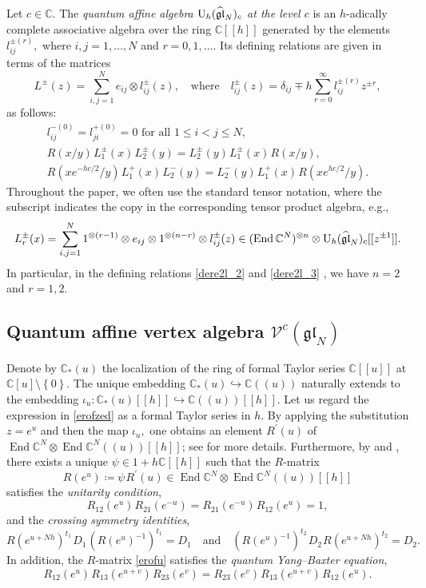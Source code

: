 \documentclass[12pt,a4paper,reqno]{amsart}
\theoremstyle{stil}
\theoremstyle{defi}
\theoremstyle{defi}
\theoremstyle{stil}
\theoremstyle{stil}
\theoremstyle{stil}
\theoremstyle{prim}
\newcommand{\fand}{\quad\text{and}\quad}
\newcommand{\non}{\nonumber}
\newcommand{\beq}{\begin{equation}}
\newcommand{\eeq}{\end{equation}}
\newcommand{\ot}{\otimes}
\newcommand{\ts}{\hspace{1pt}}
\newcommand{\ndo}{\mathop{\mathrm{End}}}
\newcommand{\uh}{{\rm U}_h (\widehat{\mathfrak{gl}}_N)_c}
\newcommand{\CC}{\mathbb{C}}
\newcommand{\Vcdva}{\mathcal{V}^{c}(\mathfrak{gl}_N)}
\begin{document}
 
 

Let $c\in\CC .$ The {\em quantum affine algebra $\uh$ at the level $c$} is an $h$-adically complete associative algebra over the ring $\CC[[h]]$ generated by the elements $l_{ij}^{\pm(r)},$ where $i,j=1,\ldots ,N $ and $r=0,1,\ldots.$ Its defining relations are given in terms of the matrices
$$
L^\pm(z)=\sum_{i,j=1}^N e_{ij} \ot l_{ij}^\pm (z),\quad\text{where}\quad
l_{ij}^\pm (z)=\delta_{ij}\mp h\sum_{r=0}^\infty l_{ij}^{\pm(r)} z^{\pm r},
$$
as follows:
\begin{gather}
l_{ij}^{-(0)}=l_{ji}^{+(0)}=0\text{ for all }1\leqslant i<j\leqslant N,\non\\
R(x/y)\ts L_1^\pm(x)\ts L_2^\pm(y)=L_2^\pm(y)\ts L_1^\pm(x)\ts R(x/y),\label{dere2l_2}\\
R(xe^{-hc/2}/y)\ts L_1^+(x)\ts L_2^-(y)=L_2^-(y)\ts L_1^+(x)\ts R(xe^{ hc/2}/y).\label{dere2l_3}
\end{gather} 
Throughout the paper, we often use the standard tensor notation, where the subscript indicates the copy in the corresponding tensor product algebra, e.g., 
$$
L_r^\pm(x)=\sum_{i,j=1}^N 1^{\ot (r-1)}\ot e_{ij} \ot 1^{\ot(n-r)}\ot l_{ij}^\pm (z)\in(\ndo\CC^N)^{\ot n}\ot\uh[[z^{\pm 1}]].
$$
In particular, in the defining relations \eqref{dere2l_2} and \eqref{dere2l_3} , we have $n=2$ and $r=1,2$.

\subsection{Quantum affine vertex algebra \texorpdfstring{$\Vcdva$}{Vc(glN)}}\label{section_0102}
Denote by   $\CC_*(u)$     the localization of the ring of formal Taylor series $\CC[[u]]$ at $\CC[u]\setminus\left\{0\right\}$. 
The unique embedding 
$\CC_*(u)\hookrightarrow\CC((u))   $ 
 naturally extends to the embedding
$\iota_u \colon \CC_*(u)[[h]]\hookrightarrow\CC((u)) [[h]].$
Let us regard the expression in \eqref{erofzed} as a formal Taylor   series in $h.$
By applying the substitution $z=e^u$ and then the map $\iota_u ,$ one obtains an element $R^\prime(u)$ of
$\ndo\CC^N \ot\ndo\CC^N  ((u))[[h]]$;  see \cite{KM} for more details. 
Furthermore, by \cite[Prop. 1.2]{EK4} and \cite[Prop. 2.1]{KM}, there exists a unique $\psi\in 1+h\CC[[h]]$ such that the $R$-matrix 
\beq\label{erofu}
R(e^u)\coloneqq \psi \ts R^\prime(u)\in \ndo\CC^N \ot\ndo\CC^N ((u))[[h]]
\eeq
satisfies the {\em unitarity condition},
\beq\label{unitarity}
R_{12}(e^u) \ts R_{21}(e^{-u}) =R_{21}(e^{-u})\ts R_{12}(e^u)=  1,
\eeq
and  
the {\em crossing symmetry identities},
$$
R(e^{u+Nh})^{t_1} \ts D_1\ts  ( R(e^u)^{-1})^{t_1}=D_1\fand (R(e^u)^{-1})^{t_2} \ts D_2 \ts R( e^{u+Nh})^{t_2} = D_2.
$$
In addition, the $R$-matrix \eqref{erofu}   
satisfies the   {\em quantum Yang--Baxter equation},
$$
R_{12}(e^u)\ts  R_{13}(e^{u+v}) \ts R_{23}(e^v)=R_{23}(e^v)\ts R_{13}(e^{u+v}) \ts R_{12}(e^u).
$$
\end{document}
